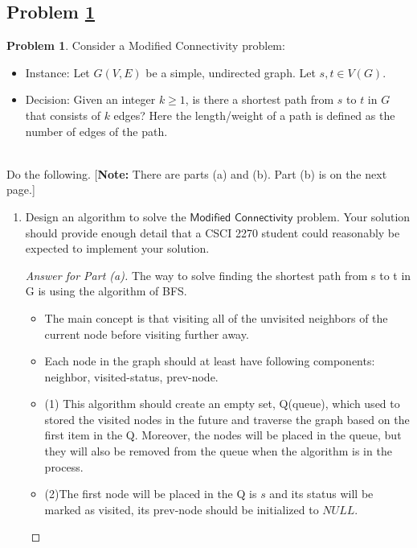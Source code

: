 \documentclass[11pt]{article}
\theoremstyle{definition}
\theoremstyle{definition}
\newtheorem{required}{Problem}
\theoremstyle{definition}
\begin{document}
\subsection{Problem \ref{DFS1}}
\begin{required} \label{DFS1}
Consider a \textsf{Modified Connectivity} problem:
\begin{itemize}
\item \textsf{Instance:} Let $G(V, E)$ be a simple, undirected graph. Let $s, t \in V(G)$.
\item \textsf{Decision:} Given an integer $k\geq 1$,  is there a shortest path from $s$ to $t$ in $G$ that consists of $k$ edges? Here the length/weight of a path is defined as the number of edges of the path. 
\end{itemize}

\noindent \\ Do the following. [\textbf{Note:} There are parts (a) and (b). Part (b) is on the next page.]
\begin{enumerate}[label=(\alph*)]
\item Design an algorithm to solve the $\textsf{Modified Connectivity}$ problem. Your solution should provide enough detail that a CSCI 2270 student could reasonably be expected to implement your solution.
\begin{proof}[Answer for Part (a)]

The way to solve finding the shortest path from s to t in G is using the algorithm of BFS.
\begin{itemize}
\item The main concept is that visiting all of the unvisited neighbors of the current node before visiting further away.
\item Each node in the graph should at least have following components: neighbor, visited-status, prev-node.

\item (1) This algorithm should create an empty set, Q(queue), which used to stored the visited nodes in the future and traverse the graph based on the first item in the Q. Moreover, the nodes will be placed in the queue, but they will also be removed from the queue when the algorithm is in the process.

\item (2)The first node will be placed in the Q is $s$ and its status will be marked as visited, its prev-node should be initialized to $NULL$.


\end{itemize}
\end{proof}
\end{enumerate}
\end{required}
\end{document}
